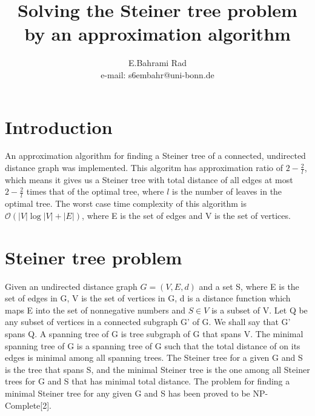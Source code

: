 \documentclass[a4paper,10pt]{article}
\begin{document}
%
	   \title{Solving the Steiner tree problem by an approximation algorithm }

   \author{E.Bahrami Rad \\ e-mail: s6embahr@uni-bonn.de}
          
   \date{}

   \maketitle
   
   \tableofcontents
 
  \newpage
    


\section{Introduction}
An approximation algorithm for finding a Steiner tree of a connected, undirected distance graph was implemented. This algoritm has approximation ratio of $2-\frac{2}{l}$, which means it gives us a Steiner tree with total distance of all edges at most $2-\frac{2}{l}$ times that of the optimal tree, where $l$ is the number of leaves in the optimal tree. The worst case time complexity of this algorithm is $ \mathcal{O}(\left| V \right|\log{}\left| V \right| + \left| E \right|)$, where E is the set of edges and V is the set of vertices.
 
 
\section{Steiner tree problem}
Given an undirected distance graph $G=(V,E,d)$ and a set S, where E is the set of edges in G, V is the set of vertices in G, d is a distance function which maps E into the set of nonnegative numbers and $S \in V$ is a subset of V. Let Q be any subset of vertices in a connected subgraph G' of G. We shall say that G' spans Q. A spanning tree of G is tree subgraph of G that spans V. The minimal spanning tree of G is a spanning tree of G such that the total distance of on its edges is minimal among all spanning trees. The Steiner tree for a given G and S is the tree that spans S, and the minimal Steiner tree is the one among all Steiner trees for G and S that has minimal total distance.
The problem for finding a minimal Steiner tree for any given G and S has been proved to be NP-Complete[2].	
\end{document}
